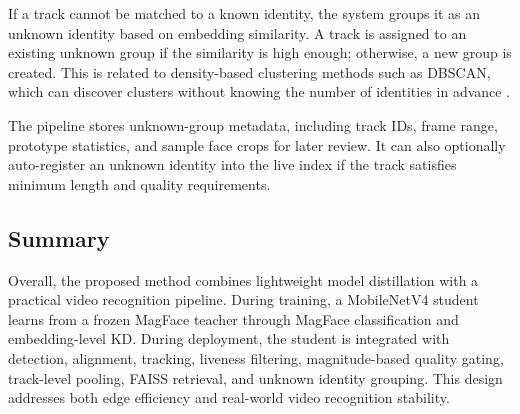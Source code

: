 If a track cannot be matched to a known identity, the system groups it as an unknown identity based on embedding similarity. A track is assigned to an existing unknown group if the similarity is high enough; otherwise, a new group is created. This is related to density-based clustering methods such as DBSCAN, which can discover clusters without knowing the number of identities in advance \cite{dbscan}.

The pipeline stores unknown-group metadata, including track IDs, frame range, prototype statistics, and sample face crops for later review. It can also optionally auto-register an unknown identity into the live index if the track satisfies minimum length and quality requirements.

\subsection{Summary}

Overall, the proposed method combines lightweight model distillation with a practical video recognition pipeline. During training, a MobileNetV4 student learns from a frozen MagFace teacher through MagFace classification and embedding-level KD. During deployment, the student is integrated with detection, alignment, tracking, liveness filtering, magnitude-based quality gating, track-level pooling, FAISS retrieval, and unknown identity grouping. This design addresses both edge efficiency and real-world video recognition stability.